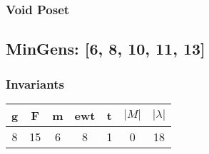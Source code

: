 \documentclass[a4paper]{article}
\begin{document}
\hfill\begin{minipage}{0.48\textwidth}
\subsubsection*{Void Poset}
\centering
{}
\end{minipage}
\newpage\subsection{MinGens: [6, 8, 10, 11, 13]}
\noindent\begin{minipage}{0.6\textwidth}
\subsubsection*{Invariants}
\centering
\begin{tabular}{|c|c|c|c|c|c|c|}
\toprule
g & F & m & ewt & t & \(|M|\) & \(|\lambda|\) \\
\midrule
8 & 15 & 6 & 8 & 1 & 0 & 18 \\
\bottomrule
\end{tabular}
\end{minipage}%
\end{document}
